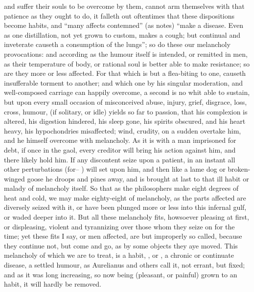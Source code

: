 and suffer their souls to be overcome by them, cannot arm themselves with that
patience as they ought to do, it falleth out oftentimes that these dispositions
become habits, and \enquote{many affects contemned} (as \Seneca{}
notes) \enquote{make a disease. Even as one distillation, not yet grown to custom,
makes a cough; but continual and inveterate causeth a consumption of the
lungs}; so do these our melancholy provocations: and according as the humour
itself is intended, or remitted in men, as their temperature of body, or
rational soul is better able to make resistance; so are they more or less
affected. For that which is but a flea-biting to one, causeth insufferable
torment to another; and which one by his singular moderation, and well-composed
carriage can happily overcome, a second is no whit able to sustain, but upon
every small occasion of misconceived abuse, injury, grief, disgrace, loss,
cross, humour, \etc{} (if solitary, or idle) yields so far to passion, that his
complexion is altered, his digestion hindered, his sleep gone, his spirits
obscured, and his heart heavy, his hypochondries misaffected; wind, crudity, on
a sudden overtake him, and he himself overcome with melancholy. As it is with a
man imprisoned for debt, if once in the gaol, every creditor will bring his
action against him, and there likely hold him. If any discontent seize upon a
patient, in an instant all other perturbations (for-- ) will set upon him, and then like a lame dog or broken-winged goose he
droops and pines away, and is brought at last to that ill habit or malady of
melancholy itself. So that as the philosophers make eight
degrees of heat and cold, we may make eighty-eight of melancholy, as the parts
affected are diversely seized with it, or have been plunged more or less into
this infernal gulf, or waded deeper into it. But all these melancholy fits,
howsoever pleasing at first, or displeasing, violent and tyrannizing over those
whom they seize on for the time; yet these fits I say, or men affected, are but
improperly so called, because they continue not, but come and go, as by some
objects they aye moved. This melancholy of which we are to treat, is a habit,
, or , a chronic or continuate disease, a
settled humour, as Aurelianus and
others call it, not errant, but fixed; and as it was long
increasing, so now being (pleasant, or painful) grown to an habit, it will
hardly be removed.


